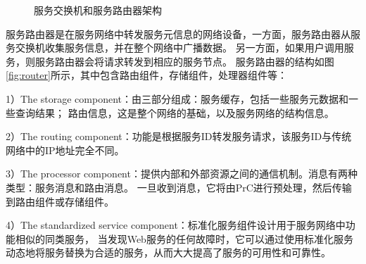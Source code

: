   \begin{figure}[htbp]
    \caption{服务交换机和服务路由器架构}
    \label{fig:switchboardAndRouter}
    \end{figure}


    服务路由器是在服务网络中转发服务元信息的网络设备，一方面，服务路由器从服务交换机收集服务信息，并在整个网络中广播数据。 
    另一方面，如果用户调用服务，则服务路由器会将请求转发到相应的服务节点。 
    服务路由器的结构如图\ref{fig:router}所示，其中包含路由组件，存储组件，处理器组件等：

    1）The storage component：由三部分组成：服务缓存，包括一些服务元数据和一些查询结果；
    路由信息，这是整个网络的基础，以及服务网络的结构信息。
    
    2）The routing component：功能是根据服务ID转发服务请求，该服务ID与传统网络中的IP地址完全不同。
    
    3）The processor component：提供内部和外部资源之间的通信机制。消息有两种类型：服务消息和路由消息。
    一旦收到消息，它将由PrC进行预处理，然后传输到路由组件或存储组件。
    
    4）The standardized service component：标准化服务组件设计用于服务网络中功能相似的同类服务，
    当发现Web服务的任何故障时，它可以通过使用标准化服务动态地将服务替换为合适的服务，从而大大提高了服务的可用性和可靠性。


